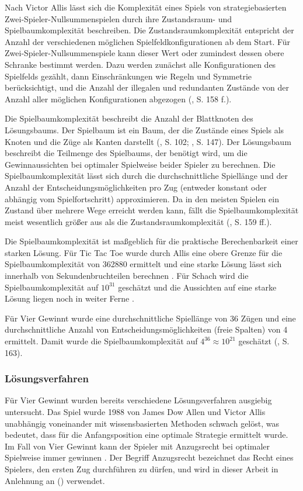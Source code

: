 Nach Victor Allis lässt sich die Komplexität eines Spiels von strategiebasierten Zwei-Spieler-Nullsummenspielen durch ihre Zustandsraum- und Spielbaumkomplexität beschreiben. Die Zustandsraumkomplexität entspricht der Anzahl der verschiedenen möglichen Spielfeldkonfigurationen ab dem Start. Für Zwei-Spieler-Nullsummenspiele kann dieser Wert oder zumindest dessen obere Schranke bestimmt werden. Dazu werden zunächst alle Konfigurationen des Spielfelds gezählt, dann Einschränkungen wie Regeln und Symmetrie berücksichtigt, und die Anzahl der illegalen und redundanten Zustände von der Anzahl aller möglichen Konfigurationen abgezogen (\cite{Allis.1994}, S. 158 f.).

Die Spielbaumkomplexität beschreibt die Anzahl der Blattknoten des Lösungsbaums. Der Spielbaum ist ein Baum, der die Zustände eines Spiels als Knoten und die Züge als Kanten darstellt (\cite{Bewersdorff.2018}, S. 102; \cite{Russell.2020}, S. 147). Der Lösungsbaum beschreibt die Teilmenge des Spielbaums, der benötigt wird, um die Gewinnaussichten bei optimaler Spielweise beider Spieler zu berechnen. Die Spielbaumkomplexität lässt sich durch die durchschnittliche Spiellänge und der Anzahl der Entscheidungsmöglichkeiten pro Zug (entweder konstant oder abhängig vom Spielfortschritt) approximieren. Da in den meisten Spielen ein Zustand über mehrere Wege erreicht werden kann, fällt die Spielbaumkomplexität meist wesentlich größer aus als die Zustandsraumkomplexität (\cite{Allis.1994}, S. 159 ff.).

Die Spielbaumkomplexität ist maßgeblich für die praktische Berechenbarkeit einer starken Lösung. Für Tic Tac Toe wurde durch Allis eine obere Grenze für die Spielbaumkomplexität von 362880 ermittelt und eine starke Lösung lässt sich innerhalb von Sekundenbruchteilen berechnen \cite{Paul.2009}. Für Schach wird die Spielbaumkomplexität auf $10^{31}$ geschätzt und die Aussichten auf eine starke Lösung liegen noch in weiter Ferne \cite{Schaeffer.2007}.

Für Vier Gewinnt wurde eine durchschnittliche Spiellänge von 36 Zügen und eine durchschnittliche Anzahl von Entscheidungsmöglichkeiten (freie Spalten) von 4 ermittelt. Damit wurde die Spielbaumkomplexität auf $4^{36} \approx 10^{21}$ geschätzt (\cite{Allis.1994}, S. 163).

\subsubsection{Lösungsverfahren}

Für Vier Gewinnt wurden bereits verschiedene Lösungsverfahren ausgiebig untersucht. Das Spiel wurde 1988 von James Dow Allen und Victor Allis unabhängig voneinander mit wissensbasierten Methoden schwach gelöst, was bedeutet, dass für die Anfangsposition eine optimale Strategie ermittelt wurde. Im Fall von Vier Gewinnt kann der Spieler mit Anzugsrecht bei optimaler Spielweise immer gewinnen \cite{Allen.2010} \cite{Allis.1988}. Der Begriff Anzugsrecht bezeichnet das Recht eines Spielers, den ersten Zug durchführen zu dürfen, und wird in dieser Arbeit in Anlehnung an (\cite{Bewersdorff.2018}) verwendet.

